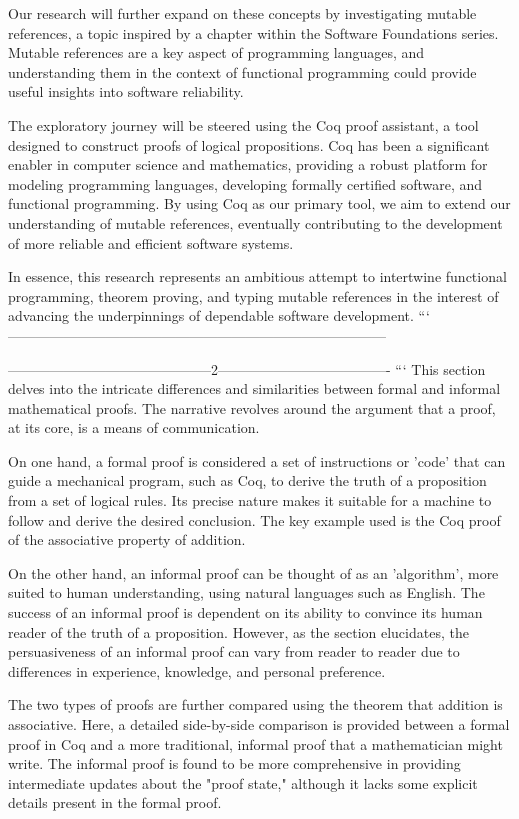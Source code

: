 Our research will further expand on these concepts by investigating mutable references, a topic inspired by a chapter within the Software Foundations series. Mutable references are a key aspect of programming languages, and understanding them in the context of functional programming could provide useful insights into software reliability.

The exploratory journey will be steered using the Coq proof assistant, a tool designed to construct proofs of logical propositions. Coq has been a significant enabler in computer science and mathematics, providing a robust platform for modeling programming languages, developing formally certified software, and functional programming. By using Coq as our primary tool, we aim to extend our understanding of mutable references, eventually contributing to the development of more reliable and efficient software systems.

In essence, this research represents an ambitious attempt to intertwine functional programming, theorem proving, and typing mutable references in the interest of advancing the underpinnings of dependable software development.
```
---------------------------------------------------------------------------------

--------------------------------------------2-------------------------------------
```
This section delves into the intricate differences and similarities between formal and informal mathematical proofs. The narrative revolves around the argument that a proof, at its core, is a means of communication.

On one hand, a formal proof is considered a set of instructions or 'code' that can guide a mechanical program, such as Coq, to derive the truth of a proposition from a set of logical rules. Its precise nature makes it suitable for a machine to follow and derive the desired conclusion. The key example used is the Coq proof of the associative property of addition.

On the other hand, an informal proof can be thought of as an 'algorithm', more suited to human understanding, using natural languages such as English. The success of an informal proof is dependent on its ability to convince its human reader of the truth of a proposition. However, as the section elucidates, the persuasiveness of an informal proof can vary from reader to reader due to differences in experience, knowledge, and personal preference.

The two types of proofs are further compared using the theorem that addition is associative. Here, a detailed side-by-side comparison is provided between a formal proof in Coq and a more traditional, informal proof that a mathematician might write. The informal proof is found to be more comprehensive in providing intermediate updates about the "proof state," although it lacks some explicit details present in the formal proof.

